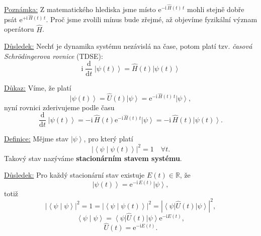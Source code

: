 \documentclass[10pt,a4paper]{article}
\newcommand{\const}[1]{\text{#1}}
\newcommand{\abs}[1]{\left| #1 \right|}
\newcommand{\dd}[2]{\frac{\const{d} #1}{\const{d} #2} \;}
\newcommand{\bra}[1]{\left< #1 \right|}
\newcommand{\ket}[1]{\left| #1 \right>}
\newcommand{\braket}[2]{\left< #1 \middle| #2 \right>}
\newcommand{\e}[1]{\const{e}^{#1}}
\renewcommand{\i}{\const{i}}
\def\R{\mathbb{R}}
\begin{document}
\vspace{2em}
\underline{Poznámka:}
Z matematického hlediska jsme místo $\e{-\i \, \hat{H}(t) \, t}$ mohli stejně dobře psát $\e{+\i \, \hat{H}(t) \, t}$. Proč jsme zvolili mínus bude zřejmé, až objevíme fyzikální význam operátoru $\hat{H}$.

\vspace{2em}
\underline{Důsledek:}
Nechť je dynamika systému nezávislá na čase, potom platí tzv. \textit{časová Schrödingerova rovnice} (TDSE):
$$ \i \; \dd{}{t} \! \ket{\psi(t)} = \hat{H}(t) \ket{\psi(t)} $$

\underline{Důkaz:}
Víme, že platí $$\ket{\psi(t)} = \hat{U}(t) \ket{\psi} = \e{-\i \, \hat{H}(t) \, t} \ket{\psi},$$ nyní rovnici zderivujeme podle času $$\dd{}{t} \ket{\psi(t)} = -\i \, \hat{H}(t) \e{-\i \, \hat{H}(t) \, t} \ket{\psi} = -\i \, \hat{H}(t) \ket{\psi(t)}.$$

\vspace{2em}
\underline{Definice:}
Mějme stav $\ket{\psi}$, pro který platí $$\abs{\braket{\psi}{\psi(t)}}^2 = 1 \quad \forall t.$$ Takový stav nazýváme \textbf{stacionárním stavem systému}.

\vspace{2em}
\underline{Důsledek:}
Pro každý stacionární stav existuje $E(t) \in \R$, že $$\ket{\psi(t)} = \e{-\i \, E(t)} \ket{\psi},$$ totiž $$\abs{\braket{\psi}{\psi}}^2 = 1 = \abs{\braket{\psi}{\psi(t)}}^2 = \abs{\bra{\psi} \hat{U}(t) \ket{\psi}}^2,$$ $$\braket{\psi}{\psi} = \bra{\psi} \hat{U}(t) \ket{\psi} \e{-\i E(t)},$$ $$\hat{U}(t) = \e{-\i E(t)}.$$
\end{document}
